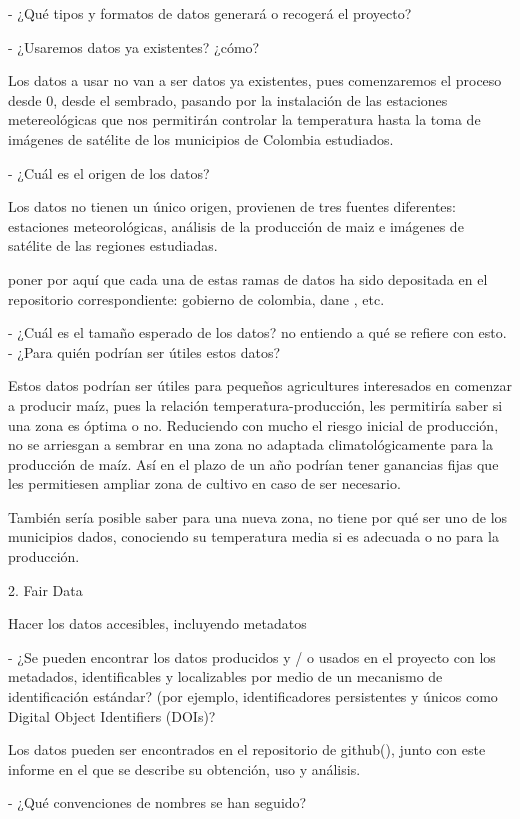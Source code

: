 \documentclass[12pt, spanish]{article}
\begin{document}
- ¿Qué tipos y formatos de datos generará o recogerá  el proyecto?

- ¿Usaremos datos ya existentes? ¿cómo?

Los datos a usar no van a ser datos ya existentes, pues comenzaremos el proceso desde 0, desde el sembrado, pasando por la instalación de las estaciones metereológicas que nos permitirán controlar la temperatura hasta la toma de imágenes de satélite de los municipios de Colombia estudiados.

- ¿Cuál es el origen de los datos?

Los datos no tienen un único origen, provienen de tres fuentes diferentes: estaciones meteorológicas, análisis de la producción de maiz e imágenes de satélite de las regiones estudiadas. 

poner por aquí que cada una de estas ramas de datos ha sido depositada en el repositorio correspondiente: gobierno de colombia, dane , etc.

- ¿Cuál es el tamaño esperado de los datos?
no entiendo a qué se refiere con esto.
- ¿Para quién podrían ser útiles estos datos?

Estos datos podrían ser útiles para pequeños agricultures interesados en comenzar a producir maíz, pues la relación temperatura-producción, les permitiría saber si una zona es óptima o no. Reduciendo con mucho el riesgo inicial de producción, no se arriesgan a sembrar en una zona no adaptada climatológicamente para la producción de maíz. Así en el plazo de un año podrían tener ganancias fijas que les permitiesen ampliar zona de cultivo en caso de ser necesario.

También sería posible saber para una nueva zona, no tiene por qué ser uno de los municipios dados, conociendo su temperatura media si es adecuada o no para la producción.

2. Fair Data

Hacer los datos accesibles, incluyendo metadatos

- ¿Se pueden encontrar los datos producidos y / o usados en el proyecto con los metadados, identificables y localizables por medio de un mecanismo  de identificación estándar? (por ejemplo, identificadores persistentes y únicos como Digital Object Identifiers (DOIs)?

Los datos pueden ser encontrados en el repositorio de github(), junto con este informe en el que se describe su obtención, uso y análisis. 

- ¿Qué convenciones de nombres se han seguido?
\end{document}
